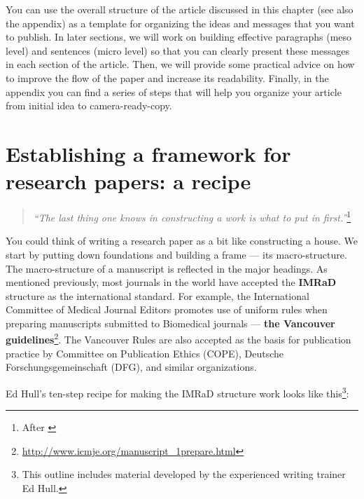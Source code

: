 \documentclass[graybox,envcountchap,sectrefs,UStrade]{svmono}
\begin{document}
You can use the overall structure of the article discussed in this chapter (see also the appendix) as a template for organizing the ideas and messages that you want to publish. In later sections, we will work on building effective paragraphs (meso level) and sentences (micro level) so that you can clearly present these messages in each section of the article. Then, we will provide some practical advice on how to improve the flow of the paper and increase its readability. Finally, in the appendix you can find a series of steps that will help you organize your article from initial idea to camera-ready-copy.\par


\section{Establishing a framework for research papers: a recipe}

\begin{quote}
    \emph{``The last thing one knows in constructing a work is what to put in first.''}\footnote{After \citet{Creedy2008research}}
\end{quote}

You could think of writing a research paper as a bit like constructing a house. We start by putting down foundations and building a frame --- its macro-structure. The macro-structure of a manuscript is reflected in the major headings. As mentioned previously, most journals in the world have accepted the \textbf{IMRaD} structure as the international standard. For example, the International Committee of Medical Journal Editors promotes use of uniform rules when preparing manuscripts submitted to Biomedical journals --- \textbf{the Vancouver guidelines}\footnote{\url{http://www.icmje.org/manuscript_1prepare.html}}. The Vancouver Rules are also accepted as the basis for publication practice by Committee on Publication Ethics (COPE), Deutsche Forschungsgemeinschaft (DFG), and similar organizations. \par

Ed Hull's ten-step recipe for making the IMRaD structure work looks like this\footnote{This outline includes material developed by the experienced writing trainer Ed Hull.}:
\end{document}

